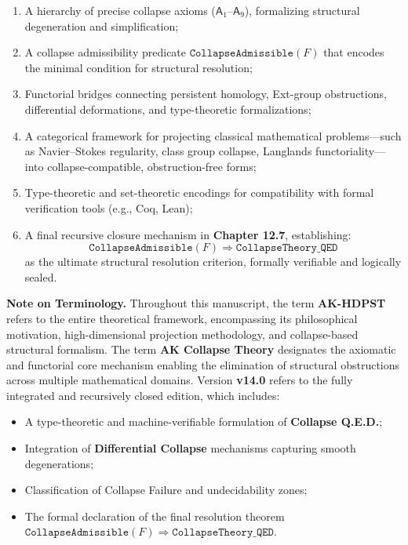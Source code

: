\documentclass[11pt]{article}
\begin{document}
\begin{enumerate}
    \item A hierarchy of precise collapse axioms ($\mathsf{A}_1$–$\mathsf{A}_9$), formalizing structural degeneration and simplification;
    \item A collapse admissibility predicate $\texttt{CollapseAdmissible}(F)$ that encodes the minimal condition for structural resolution;
    \item Functorial bridges connecting persistent homology, Ext-group obstructions, differential deformations, and type-theoretic formalizations;
    \item A categorical framework for projecting classical mathematical problems—such as Navier–Stokes regularity, class group collapse, Langlands functoriality—into collapse-compatible, obstruction-free forms;
    \item Type-theoretic and set-theoretic encodings for compatibility with formal verification tools (e.g., Coq, Lean);
    \item A final recursive closure mechanism in \textbf{Chapter 12.7}, establishing:
    \[
    \boxed{
    \texttt{CollapseAdmissible}(F) \Rightarrow \texttt{CollapseTheory\_QED}
    }
    \]
    as the ultimate structural resolution criterion, formally verifiable and logically sealed.
\end{enumerate}

\vspace{1em}
\noindent\textbf{Note on Terminology.}  
Throughout this manuscript, the term \textbf{AK-HDPST} refers to the entire theoretical framework, encompassing its philosophical motivation, high-dimensional projection methodology, and collapse-based structural formalism.  
The term \textbf{AK Collapse Theory} designates the axiomatic and functorial core mechanism enabling the elimination of structural obstructions across multiple mathematical domains.  
Version \textbf{v14.0} refers to the fully integrated and recursively closed edition, which includes:
\begin{itemize}
    \item A type-theoretic and machine-verifiable formulation of \textbf{Collapse Q.E.D.};
    \item Integration of \textbf{Differential Collapse} mechanisms capturing smooth degenerations;
    \item Classification of Collapse Failure and undecidability zones;
    \item The formal declaration of the final resolution theorem $\texttt{CollapseAdmissible}(F) \Rightarrow \texttt{CollapseTheory\_QED}$.
\end{itemize}
\end{document}
